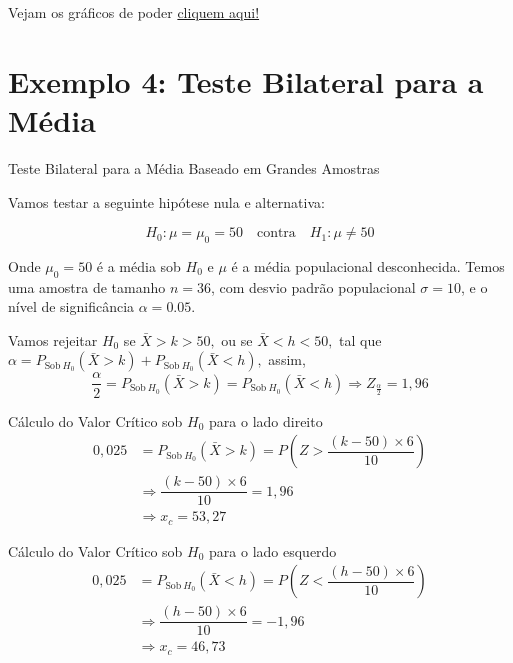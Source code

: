 \documentclass[12pt]{beamer}
\begin{document}
\begin{frame}{}
	\begin{block}{}
		Vejam os gráficos de poder \href{https://est711.shinyapps.io/FuncaoPoder/}{cliquem aqui!}
	\end{block}
\end{frame}

\section{Exemplo 4: Teste Bilateral para a Média}
\begin{frame}{Teste Bilateral para a Média Baseado em Grandes Amostras}
	\begin{block}{}
		\justifying
		Vamos testar a seguinte hipótese nula e alternativa:
		
		\[
		H_0: \mu = \mu_0 = 50 \quad \text{contra} \quad H_1: \mu \neq 50
		\]
		
		Onde \( \mu_0 = 50 \) é a média sob \( H_0 \) e \( \mu \) é a média populacional desconhecida. Temos uma amostra de tamanho \( n = 36 \), com desvio padrão populacional \( \sigma = 10 \), e o nível de significância \( \alpha = 0.05 \).
		
	\end{block}
	\pause
	\begin{block}{}
		\justifying
		Vamos rejeitar $H_0$ se $\bar{X}>k>50,$ ou se $\bar{X}<h<50,$ tal que $\alpha=P_{\text{Sob}~H_{0}}(\bar{X}>k)+P_{\text{Sob}~H_{0}}(\bar{X}<h),$ assim,
		\[
		\dfrac{\alpha}{2}=P_{\text{Sob}~H_{0}}(\bar{X}>k)=P_{\text{Sob}~H_{0}}(\bar{X}<h)\Rightarrow Z_{\frac{\alpha}{2}} = 1,96
		\]	
	\end{block}
\end{frame}

\begin{frame}{}
	\begin{block}{Cálculo do Valor Crítico sob $H_{0}$ para o lado direito}
		\justifying
		\begin{align*}
			0,025&=P_{\text{Sob}~H_{0}}(\bar{X}>k)=P(Z>\dfrac{(k-50)\times6}{10})\\
			&\Rightarrow \dfrac{(k-50)\times6}{10}=1,96\\
			&\Rightarrow x_{c}=53,27
		\end{align*}
	\end{block}
	\pause
	\begin{block}{Cálculo do Valor Crítico sob $H_{0}$ para o lado esquerdo}
		\justifying
		\begin{align*}
			0,025&=P_{\text{Sob}~H_{0}}(\bar{X}<h)=P(Z<\dfrac{(h-50)\times6}{10})\\
			&\Rightarrow \dfrac{(h-50)\times6}{10}=-1,96\\
			&\Rightarrow x_{c}=46,73
		\end{align*}
	\end{block}
\end{frame}
\end{document}
